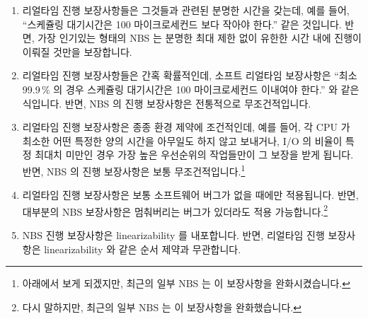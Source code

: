 \begin{enumerate}
\item	리얼타임 진행 보장사항들은 그것들과 관련된 분명한 시간을 갖는데, 예를
	들어, ``스케쥴링 대기시간은 100 마이크로세컨드 보다 작아야 한다.'' 같은
	것입니다.
	반면, 가장 인기있는 형태의 NBS 는 분명한 최대 제한 없이 유한한 시간
	내에 진행이 이뤄질 것만을 보장합니다.
\item	리얼타임 진행 보장사항들은 간혹 확률적인데, 소프트 리얼타임 보장사항은
	``최소 99.9\,\% 의 경우 스케쥴링 대기시간은 100 마이크로세컨드 이내여야
	한다.'' 와 같은 식입니다.
	반면, NBS 의 진행 보장사항은 전통적으로 무조건적입니다.
\item	리얼타임 진행 보장사항은 종종 환경 제약에 조건적인데, 예를 들어, 각 CPU
	가 최소한 어떤 특정한 양의 시간을 아무일도 하지 않고 보내거나, I/O 의
	비율이 특정 최대치 미만인 경우 가장 높은 우선순위의 작업들만이 그
	보장을 받게 됩니다.
	반면, NBS 의 진행 보장사항은 보통 무조건적입니다.\footnote{
		아래에서 보게 되겠지만, 최근의 일부 NBS 는 이 보장사항을
		완화시켰습니다.}
\item	리얼타임 진행 보장사항은 보통 소프트웨어 버그가 없을 때에만 적용됩니다.
	반면, 대부분의 NBS 보장사항은 멈춰버리는 버그가 있더라도 적용
	가능합니다.\footnote{
		다시 말하지만, 최근의 일부 NBS 는 이 보장사항을 완화했습니다.}
\item	NBS 진행 보장사항은 linearizability 를 내포합니다.
	반면, 리얼타임 진행 보장사항은 linearizability 와 같은 순서 제약과
	무관합니다.
\end{enumerate}
\iffalse

\item	Real-time forward-progress guarantees usually have some
	definite time associated with them, for example,
	``scheduling latency must be less than 100 microseconds.''.
	In contrast, the most popular forms of NBS only guarantees
	that progress will be made in finite time, with no definite
	bound.
\item	Real-time forward-progress guarantees are sometimes
	probabilistic, as in the soft-real-time guarantee that
	``at least 99.9\,\% of the time, scheduling latency must
	be less than 100 microseconds.''
	In contrast, NBS's forward-progress
	guarantees have traditionally been unconditional.
\item	Real-time forward-progress guarantees are often conditioned on
	environmental constraints, for example, only being honored
	for the highest-priority tasks, when each CPU spends at least
	a certain fraction of its time idle, or when I/O rates are
	below some specified maximum.
	In contrast, NBS's forward-progress
	guarantees are usually unconditional.\footnote{
		As we will see below, some recent NBS work relaxes
		this guarantee.}
\item	Real-time forward-progress guarantees usually apply only
	in the absence of software bugs.
	In contrast, most NBS guarantees apply even in the face of
	fail-stop bugs.\footnote{
		Again, some recent NBS work relaxes this guarantee.}
\item	NBS forward-progress guarantee classes imply linearizability.
	In contrast, real-time forward progress guarantees are often
	independent of ordering constraints such as linearizability.
\end{enumerate}
\fi

